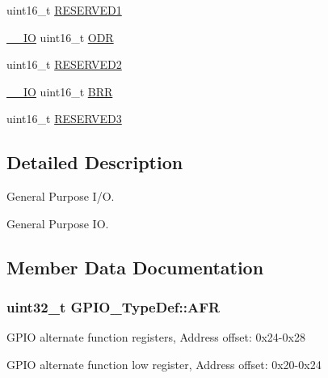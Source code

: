 \begin{DoxyCompactItemize}
\item 
uint16\-\_\-t \hyperlink{struct_g_p_i_o___type_def_a6873e6635592f8ecd30ad73fe3301225}{R\-E\-S\-E\-R\-V\-E\-D1}
\item 
\hyperlink{group___c_m_s_i_s__core__definitions_gaec43007d9998a0a0e01faede4133d6be}{\-\_\-\-\_\-\-I\-O} uint16\-\_\-t \hyperlink{struct_g_p_i_o___type_def_a85ce31084cefb4431ee8fd397555a82f}{O\-D\-R}
\item 
uint16\-\_\-t \hyperlink{struct_g_p_i_o___type_def_a67d9355cb52b179d1d34e860a6750a8a}{R\-E\-S\-E\-R\-V\-E\-D2}
\item 
\hyperlink{group___c_m_s_i_s__core__definitions_gaec43007d9998a0a0e01faede4133d6be}{\-\_\-\-\_\-\-I\-O} uint16\-\_\-t \hyperlink{struct_g_p_i_o___type_def_a08108dc67ac01f2d1c18a085c3bbffdd}{B\-R\-R}
\item 
uint16\-\_\-t \hyperlink{struct_g_p_i_o___type_def_a0d4f86adb13774488d491504df642e3c}{R\-E\-S\-E\-R\-V\-E\-D3}
\end{DoxyCompactItemize}


\subsection{Detailed Description}
General Purpose I/\-O. 

General Purpose I\-O. 

\subsection{Member Data Documentation}
\hypertarget{struct_g_p_i_o___type_def_af5b9bb2c6faec85580a3113de9af2fd0}{
\subsubsection[{A\-F\-R}]{ uint32\-\_\-t G\-P\-I\-O\-\_\-\-Type\-Def\-::\-A\-F\-R}}\label{struct_g_p_i_o___type_def_af5b9bb2c6faec85580a3113de9af2fd0}
G\-P\-I\-O alternate function registers, Address offset\-: 0x24-\/0x28

G\-P\-I\-O alternate function low register, Address offset\-: 0x20-\/0x24

